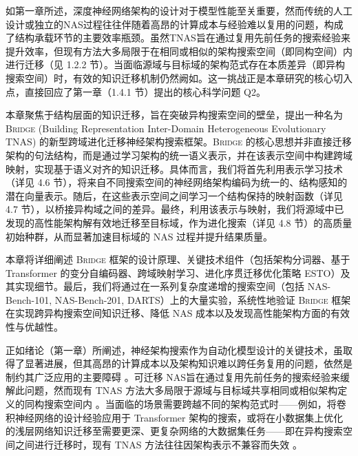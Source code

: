 \documentclass[../main.tex]{subfiles}
\begin{document}
\label{sec:ch4-evolutionary-transfer-nas-heterogeneous-spaces}

\label{sec:ch4-1-introduction}

如第一章所述，深度神经网络架构的设计对于模型性能至关重要，然而传统的人工设计或独立的NAS过程往往伴随着高昂的计算成本与经验难以复用的问题，构成了结构承载环节的主要效率瓶颈。虽然TNAS旨在通过复用先前任务的搜索经验来提升效率，但现有方法大多局限于在相同或相似的架构搜索空间（即同构空间）内进行迁移（见 1.2.2 节）。当面临源域与目标域的架构范式存在本质差异（即异构搜索空间）时，有效的知识迁移机制仍然阙如。这一挑战正是本章研究的核心切入点，直接回应了第一章（1.4.1 节）提出的核心科学问题 Q2。

本章聚焦于结构层面的知识迁移，旨在突破异构搜索空间的壁垒，提出一种名为 \textsc{Bridge} (Building Representation Inter-Domain Heterogeneous Evolutionary TNAS) 的新型跨域进化迁移神经架构搜索框架。\textsc{Bridge} 的核心思想并非直接迁移架构的句法结构，而是通过学习架构的统一语义表示，并在该表示空间中构建跨域映射，实现基于语义对齐的知识迁移。具体而言，我们将首先利用表示学习技术（详见 4.6 节），将来自不同搜索空间的神经网络架构编码为统一的、结构感知的潜在向量表示。随后，在这些表示空间之间学习一个结构保持的映射函数（详见 4.7 节），以桥接异构域之间的差异。最终，利用该表示与映射，我们将源域中已发现的高性能架构解有效地迁移至目标域，作为进化搜索（详见 4.8 节）的高质量初始种群，从而显著加速目标域的 NAS 过程并提升结果质量。

本章将详细阐述 \textsc{Bridge} 框架的设计原理、关键技术组件（包括架构分词器、基于 Transformer 的变分自编码器、跨域映射学习、进化序贯迁移优化策略 ESTO）及其实现细节。最后，我们将通过在一系列复杂度递增的搜索空间（包括 NAS-Bench-101, NAS-Bench-201, DARTS）上的大量实验，系统性地验证 \textsc{Bridge} 框架在实现跨异构搜索空间知识迁移、降低 NAS 成本以及发现高性能架构方面的有效性与优越性。

\label{sec:ch4-2-problem-background-and-motivation}

正如绪论（第一章）所阐述，神经架构搜索作为自动化模型设计的关键技术，虽取得了显著进展，但其高昂的计算成本以及架构知识难以跨任务复用的问题，依然是制约其广泛应用的主要障碍 。可迁移 NAS旨在通过复用先前任务的搜索经验来缓解此问题，然而现有 TNAS 方法大多局限于源域与目标域共享相同或相似架构定义的同构搜索空间内 。当面临的场景需要跨越不同的架构范式时——例如，将卷积神经网络的设计经验应用于 Transformer 架构的搜索，或将在小数据集上优化的浅层网络知识迁移至需要更深、更复杂网络的大数据集任务——即在异构搜索空间之间进行迁移时，现有 TNAS 方法往往因架构表示不兼容而失效 。
\end{document}
